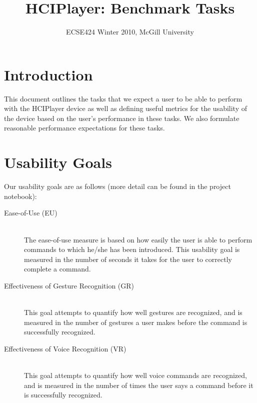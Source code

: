 \documentclass[12pt,letterpaper]{article}
\begin{document}
\title{HCIPlayer: Benchmark Tasks}
\author{ECSE424 Winter 2010, McGill University}
\renewcommand{\today}{Updated: Monday, March 8th, 2010}
\maketitle

\section{Introduction}
This document outlines the tasks that we expect a user to be able to perform with the HCIPlayer device as well as defining useful metrics for the usability of the device based on the user's performance in these tasks. We also formulate reasonable performance expectations for these tasks.

\section{Usability Goals}

Our usability goals are as follows (more detail can be found in the project notebook):

\begin{description}
\item[Ease-of-Use (EU)] \hfill \\
The ease-of-use measure is based on how easily the user is able to perform commands to which he/she has been introduced. This usability goal is measured in the number of seconds it takes for the user to correctly complete a command.
\item[Effectiveness of Gesture Recognition (GR)] \hfill \\
This goal attempts to quantify how well gestures are recognized, and is measured in the number of gestures a user makes before the command is successfully recognized.
\item[Effectiveness of Voice Recognition (VR)] \hfill \\
This goal attempts to quantify how well voice commands are recognized, and is measured in the number of times the user says a command before it is successfully recognized.
\end{description}
\end{document}
